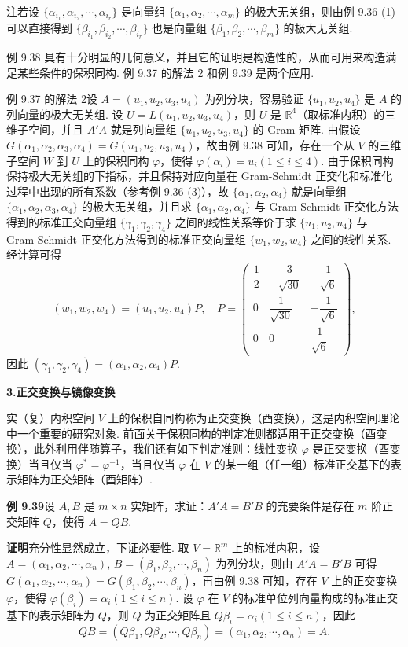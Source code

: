 \documentclass[UTF8, 12pt, fontset=fandol, oneside]{ctexart}
\begin{document}
注\quad 若设 $\{\alpha_{i_1},\alpha_{i_2},\cdots,\alpha_{i_r}\}$ 是向量组 $\{\alpha_1,\alpha_2,\cdots,\alpha_m\}$ 的极大无关组，则由例 9.36 (1) 可以直接得到 $\{\beta_{i_1},\beta_{i_2},\cdots,\beta_{i_r}\}$ 也是向量组 $\{\beta_1,\beta_2,\cdots,\beta_m\}$ 的极大无关组.

例 9.38 具有十分明显的几何意义，并且它的证明是构造性的，从而可用来构造满足某些条件的保积同构. 例 9.37 的解法 2 和例 9.39 是两个应用.

例 9.37 的解法 2\quad 设 $A=(u_1,u_2,u_3,u_4)$ 为列分块，容易验证 $\{u_1,u_2,u_4\}$ 是 $A$ 的列向量的极大无关组. 设 $U=L(u_1,u_2,u_3,u_4)$，则 $U$ 是 $\mathbb{R}^4$（取标准内积）的三维子空间，并且 $A'A$ 就是列向量组 $\{u_1,u_2,u_3,u_4\}$ 的 Gram 矩阵. 由假设 $G(\alpha_1,\alpha_2,\alpha_3,\alpha_4)=G(u_1,u_2,u_3,u_4)$，故由例 9.38 可知，存在一个从 $V$ 的三维子空间 $W$ 到 $U$ 上的保积同构 $\varphi$，使得 $\varphi(\alpha_i)=u_i(1\le i\le 4)$. 由于保积同构保持极大无关组的下指标，并且保持对应向量在 Gram-Schmidt 正交化和标准化过程中出现的所有系数（参考例 9.36 (3)），故 $\{\alpha_1,\alpha_2,\alpha_4\}$ 就是向量组 $\{\alpha_1,\alpha_2,\alpha_3,\alpha_4\}$ 的极大无关组，并且求 $\{\alpha_1,\alpha_2,\alpha_4\}$ 与 Gram-Schmidt 正交化方法得到的标准正交向量组 $\{\gamma_1,\gamma_2,\gamma_4\}$ 之间的线性关系等价于求 $\{u_1,u_2,u_4\}$ 与 Gram-Schmidt 正交化方法得到的标准正交向量组 $\{w_1,w_2,w_4\}$ 之间的线性关系. 经计算可得
\[
(w_1,w_2,w_4)=(u_1,u_2,u_4)P,\quad
P=
\begin{pmatrix}
\dfrac12&-\dfrac3{\sqrt{30}}&-\dfrac1{\sqrt6}\\
0&\dfrac1{\sqrt{30}}&-\dfrac1{\sqrt6}\\
0&0&\dfrac1{\sqrt6}
\end{pmatrix},
\]
因此 $(\gamma_1,\gamma_2,\gamma_4)=(\alpha_1,\alpha_2,\alpha_4)P$.

\noindent\textbf{3.\quad 正交变换与镜像变换}

实（复）内积空间 $V$ 上的保积自同构称为正交变换（酉变换），这是内积空间理论中一个重要的研究对象. 前面关于保积同构的判定准则都适用于正交变换（酉变换），此外利用伴随算子，我们还有如下判定准则：线性变换 $\varphi$ 是正交变换（酉变换）当且仅当 $\varphi^*=\varphi^{-1}$，当且仅当 $\varphi$ 在 $V$ 的某一组（任一组）标准正交基下的表示矩阵为正交矩阵（酉矩阵）.

\noindent\textbf{例 9.39}\quad 设 $A,B$ 是 $m\times n$ 实矩阵，求证：$A'A=B'B$ 的充要条件是存在 $m$ 阶正交矩阵 $Q$，使得 $A=QB$.

\noindent\textbf{证明}\quad 充分性显然成立，下证必要性. 取 $V=\mathbb{R}^m$ 上的标准内积，设 $A=(\alpha_1,\alpha_2,\cdots,\alpha_n)$, $B=(\beta_1,\beta_2,\cdots,\beta_n)$ 为列分块，则由 $A'A=B'B$ 可得 $G(\alpha_1,\alpha_2,\cdots,\alpha_n)=G(\beta_1,\beta_2,\cdots,\beta_n)$，再由例 9.38 可知，存在 $V$ 上的正交变换 $\varphi$，使得 $\varphi(\beta_i)=\alpha_i(1\le i\le n)$. 设 $\varphi$ 在 $V$ 的标准单位列向量构成的标准正交基下的表示矩阵为 $Q$，则 $Q$ 为正交矩阵且 $Q\beta_i=\alpha_i(1\le i\le n)$，因此
\[
QB=(Q\beta_1,Q\beta_2,\cdots,Q\beta_n)=(\alpha_1,\alpha_2,\cdots,\alpha_n)=A.
\]
\end{document}
